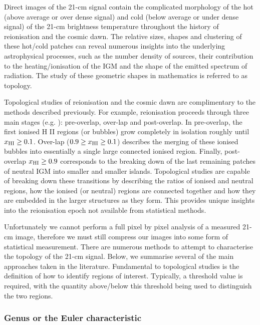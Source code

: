 Direct images of the 21-cm signal contain the complicated morphology of the hot (above average or over dense signal) and cold (below average or under dense signal) of the 21-cm brightness temperature throughout the history of reionisation and the cosmic dawn. The relative sizes, shapes and clustering of these hot/cold patches can reveal numerous insights into the underlying astrophysical processes, such as the number density of sources, their contribution to the heating/ionisation of the IGM and the shape of the emitted spectrum of radiation. The study of these geometric shapes in mathematics is referred to as topology.

Topological studies of reionisation and the cosmic dawn are complimentary to the methods described previously. For example, reionisation proceeds through three main stages (e.g. \cite{Gnedin:2000,Furlanetto:2016}): pre-overlap, over-lap and post-overlap. In pre-overlap, the first ionised H {\scriptsize II} regions (or bubbles) grow completely in isolation roughly until $x_{\rm HI} \geq 0.1$. Over-lap ($ 0.9 \geq x_{\rm HI} \geq 0.1$) describes the merging of these ionised bubbles into essentially a single large connected ionised region. Finally, post-overlap $x_{\rm HI} \geq 0.9$ corresponds to the breaking down of the last remaining patches of neutral IGM into smaller and smaller islands. Topological studies are capable of breaking down these transitions by describing the ratios of ionised and neutral regions, how the ionised (or neutral) regions are connected together and how they are embedded in the larger structures as they form. This provides unique insights into the reionisation epoch not available from statistical methods.

Unfortunately we cannot perform a full pixel by pixel analysis of a measured 21-cm image, therefore we must still compress our images into some form of statistical measurement. There are numerous methods to attempt to characterise the topology of the 21-cm signal. Below, we summarise several of the main approaches taken in the literature. Fundamental to topological studies is the definition of how to identify regions of interest. Typically, a threshold value is required, with the quantity above/below this threshold being used to distinguish the two regions.

\subsubsection{Genus or the Euler characteristic}

